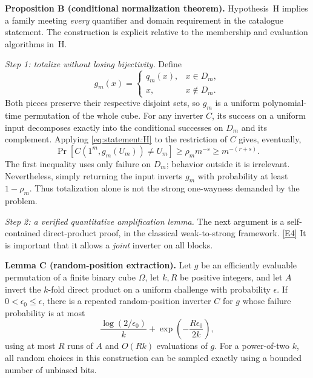 \documentclass[11pt,a4paper]{article}
\newcommand{\eref}[2]{\hyperlink{extra:#1:#2}{[E#2]}}
\numberwithin{equation}{section}
\begin{document}
\textbf{Proposition B (conditional normalization theorem).}
Hypothesis~H implies a family meeting \emph{every} quantifier and domain
requirement in the catalogue statement. The construction is explicit relative to the
membership and evaluation algorithms in~H.

\textit{Step 1: totalize without losing bijectivity.}
Define
\begin{equation}\label{eq:statement:guard}
 g_m(x)=\begin{cases}q_m(x),&x\in D_m,\\x,&x\notin D_m.\end{cases}
\end{equation}
Both pieces preserve their respective disjoint sets, so $g_m$ is a
uniform polynomial-time permutation of the whole cube. For any
inverter $C$, its success on a uniform input decomposes exactly into the
conditional successes on $D_m$ and its complement. Applying
\eqref{eq:statement:H} to the restriction of $C$ gives, eventually,
\begin{equation}\label{eq:statement:weak}
 \Pr[C(1^m,g_m(U_m))\ne U_m]
       \ge \rho_m m^{-s}\ge m^{-(r+s)}.
\end{equation}
The first inequality uses only failure on $D_m$; behavior outside it is
irrelevant. Nevertheless, simply returning the input inverts $g_m$ with
probability at least $1-\rho_m$. Thus totalization alone is not the
strong one-wayness demanded by the problem.

\textit{Step 2: a verified quantitative amplification lemma.}
The next argument is a self-contained direct-product proof, in the
classical weak-to-strong framework. \eref{statement}{4}
It is important that it allows a \emph{joint} inverter on all blocks.

\textbf{Lemma C (random-position extraction).}
Let $g$ be an efficiently evaluable permutation of a finite binary cube
$\Omega$, let $k,R$ be positive integers, and let $A$ invert the
$k$-fold direct product on a uniform
challenge with probability $\epsilon$. If
$0<\epsilon_0\le\epsilon$, there is a repeated random-position inverter
$C$ for $g$ whose failure probability is at most
\begin{equation}\label{eq:statement:extract}
 \frac{\log(2/\epsilon_0)}{k}
     +\exp\left(-\frac{R\epsilon_0}{2k}\right),
\end{equation}
using at most $R$ runs of $A$ and $O(Rk)$ evaluations of $g$.
For a power-of-two $k$, all random choices in this construction can be
sampled exactly using a bounded number of unbiased bits.
\end{document}

